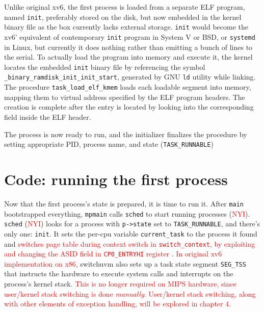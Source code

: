 \documentclass{report}
\def \hilite#1{\textcolor{red}{#1}}
\newenvironment{hilight}{\color{red}}{\color{black}}
\begin{document}
\begin{hilight}
		Unlike original xv6, the first process is loaded from a separate ELF program, named \texttt{init},
		preferably stored on the disk, but now embedded in the kernel binary file as the box currently lacks
		external storage.
		\texttt{init} would become the xv6' equivalent of contemporary \texttt{init}
		program in System V or BSD, or \texttt{systemd} in Linux, but currently it does nothing rather than
		emitting a bunch of lines to the serial.
		\marginpar{
			\footnotesize\ttfamily
			\textcolor{red}{ramdisk/init/init.c}
		}
		To actually load the program into memory and execute it, the kernel locates the embedded
		\texttt{init} binary file by referencing the symbol \texttt{\_binary\_ramdisk\_init\_init\_start},
		\marginpar{
			\footnotesize\ttfamily
			\textcolor{red}{kern/sched/task.c:113}
		}
		generated by GNU \texttt{ld} utility while linking.  The procedure \texttt{task\_load\_elf\_kmem}
		\marginpar{
			\footnotesize\ttfamily
			\textcolor{red}{kern/syscall/\\execve.c:118}
		}
		loads each loadable segment into memory, mapping them to virtual address specified by the ELF
		program headers.  The creation is complete after the entry is located by looking into the
		corresponding field inside the ELF header.

		The process is now ready to run, and the initializer finalizes the procedure by setting appropriate
		PID, process name, and state (\texttt{TASK\_RUNNABLE})
	\end{hilight}
	
	\section{Code: running the first process}
	Now that the first process's state is prepared, it is time to run it. After \texttt{main} bootstrapped
	everything, \texttt{mpmain} calls \texttt{sched}
	\marginpar{
		\footnotesize\ttfamily
		\hilite{kern/sched/sched.c}
	} to start running processes (\hilite{NYI}). 
	\texttt{sched} (\hilite{NYI})
	looks for a process with \texttt{p->state} set to \texttt{TASK\_RUNNABLE}, and there's only one:
	\texttt{init}. It
	sets the per-cpu variable \texttt{current\_task}
	\marginpar{
		\footnotesize\ttfamily
		\hilite{arch/mips/include/\\asm/thread\_info.h:47}
	}
	to the process it found and \hilite{
		switches page table during context switch in \texttt{switch\_context},
		\marginpar{
			\footnotesize\ttfamily
			\hilite{arch/mips/sched/switch.S}
		} by exploiting and changing the ASID field in \texttt{CP0\_ENTRYHI}
		register
	}. \hilite{In original xv6 implementation on x86,} switchuvm also sets up a task
	state segment \texttt{SEG\_TSS} that instructs the hardware to execute system calls and 
	interrupts on the process's kernel stack. \hilite{
		This is no longer required on MIPS hardware, since user/kernel stack switching is done
		\emph{manually}.  User/kernel stack switching, along with other elements of exception
		handling, will be explored in chapter 4.
	}
	
\end{document}
